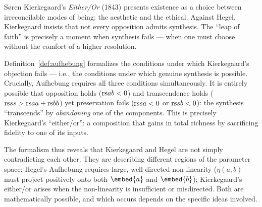 \begin{interpretation}
\label{interp:ch16:kierkegaard_either_or}
S\o{}ren Kierkegaard's \textit{Either/Or} (1843) presents existence as a
choice between irreconcilable modes of being: the aesthetic and the ethical.
Against Hegel, Kierkegaard insists that not every opposition admits
synthesis.  The ``leap of faith'' is precisely a moment when synthesis fails
--- when one must choose without the comfort of a higher resolution.

Definition~\ref{def:aufhebung} formalizes the conditions under which
Kierkegaard's objection fails --- i.e., the conditions under which
genuine synthesis is possible.  Crucially, Aufhebung requires all three
conditions simultaneously.  It is entirely possible that opposition holds
($\mathrm{rs}{a}{b} < 0$) and transcendence holds ($\mathrm{rs}{s}{s} > \mathrm{rs}{a}{a} +
\mathrm{rs}{b}{b}$) yet preservation fails ($\mathrm{rs}{s}{a} < 0$ or $\mathrm{rs}{s}{b} < 0$):
the synthesis ``transcends'' by \emph{abandoning} one of the components.
This is precisely Kierkegaard's ``either/or'': a composition that gains
in total richness by sacrificing fidelity to one of its inputs.

The formalism thus reveals that Kierkegaard and Hegel are not simply
contradicting each other.  They are describing different regions of the
parameter space: Hegel's Aufhebung requires large, well-directed
non-linearity ($\eta(a,b)$ must project positively onto both
$\embed{a}$ and $\embed{b}$); Kierkegaard's either/or arises when the
non-linearity is insufficient or misdirected.  Both are mathematically
possible, and which occurs depends on the specific ideas involved.
\end{interpretation}

